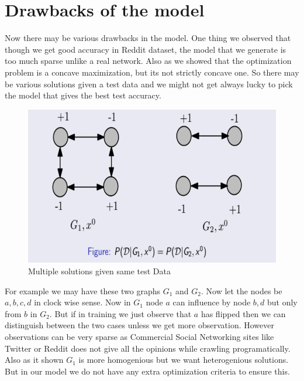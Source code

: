 \section*{Drawbacks of the model}
Now there may be various drawbacks in the model. One thing we observed that though we get good accuracy in Reddit dataset, the model that we generate is too much sparse unlike a real network. Also as we showed that the optimization problem is a concave maximization, but its not strictly concave one. So there may be various solutions given a test data and we might not get always lucky to pick the model that gives the best test accuracy.
\begin{figure}
\centering
\includegraphics[width=\textwidth,height=\textheight,keepaspectratio]{opinion_dynamics/images/non_strict.png}
\caption{Multiple solutions given same test Data}
\label{fig:Reddit_plot}
\end{figure}
For example we may have these two graphs $G_1$ and $G_2$. Now let the nodes be $a,b,c,d$ in clock wise sense. Now in $G_1$ node $a$ can influence by node $b,d$ but only from $b$ in $G_2$. But if in training we just observe that $a$ has flipped then we can distinguish between the two cases unless we get more observation. However observations can be very sparse as Commercial Social Networking sites like Twitter or Reddit does not give all the opinions while crawling programatically. Also as it shown $G_1$ is more homogenious but we want heterogenious solutions. But in our model we do not have any extra optimization criteria to ensure this.
